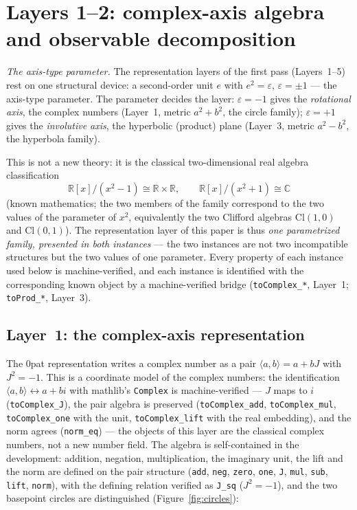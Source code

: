 \documentclass{article}
\begin{document}
\section{Layers 1--2: complex-axis algebra and observable decomposition}
\label{sec:L1}

\emph{The axis-type parameter.} The representation layers of the first
pass (Layers~1--5) rest on one structural device: a second-order unit
$e$ with $e^2=\varepsilon$, $\varepsilon=\pm1$ --- the axis-type
parameter. The parameter decides the layer:
$\varepsilon=-1$ gives the \emph{rotational axis}, the complex numbers
(Layer~1, metric $a^2+b^2$, the circle family);
$\varepsilon=+1$ gives the \emph{involutive axis}, the hyperbolic
(product) plane (Layer~3, metric $a^2-b^2$, the hyperbola family).

This is not a new theory: it is the classical two-dimensional real
algebra classification
\[
\mathbb R[x]/(x^2-1)\cong\mathbb R\times\mathbb R,\qquad
\mathbb R[x]/(x^2+1)\cong\mathbb C
\]
(known mathematics; the two members of the family correspond to the
two values of the parameter of $x^2$, equivalently the two Clifford
algebras $\mathrm{Cl}(1,0)$ and $\mathrm{Cl}(0,1)$). The representation
layer of this paper is thus \emph{one parametrized family, presented in
both instances} --- the two instances are not two incompatible
structures but the two values of one parameter. Every property of each
instance used below is
machine-verified, and each instance is identified with the
corresponding known object by a machine-verified bridge
(\texttt{toComplex\_*}, Layer~1; \texttt{toProd\_*}, Layer~3).

\subsection{Layer~1: the complex-axis representation}
\label{sec:L1a}

The 0pat representation writes a complex number as a pair
$\langle a,b\rangle=a+bJ$ with $J^2=-1$. This is a coordinate model of
the complex numbers: the identification
$\langle a,b\rangle\leftrightarrow a+bi$ with mathlib's
\texttt{Complex} is machine-verified --- $J$ maps to $i$
(\texttt{toComplex\_J}), the pair algebra is preserved
(\texttt{toComplex\_add}, \texttt{toComplex\_mul}, \texttt{toComplex\_one}
with the unit, \texttt{toComplex\_lift} with the real embedding), and the
norm agrees (\texttt{norm\_eq})
--- the objects of this
layer are the classical complex numbers, not a new number field. The
algebra is self-contained in
the development: addition, negation, multiplication, the imaginary unit, the
lift and the norm are defined on the pair structure
(\texttt{add}, \texttt{neg}, \texttt{zero}, \texttt{one}, \texttt{J},
\texttt{mul}, \texttt{sub}, \texttt{lift}, \texttt{norm}), with the
defining relation verified as \texttt{J\_sq} ($J^2=-1$), and the two
basepoint circles are distinguished (Figure~\ref{fig:circles}):
\end{document}
